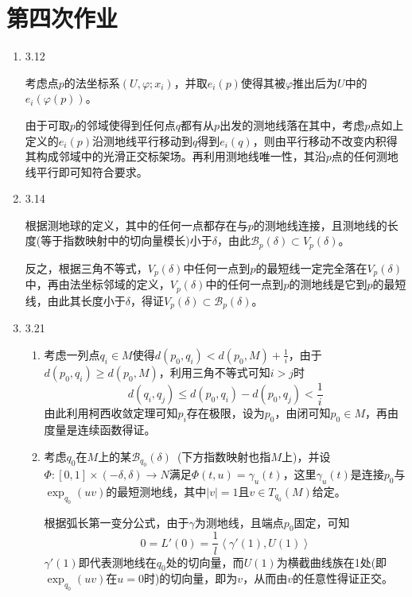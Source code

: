 \documentclass[a4paper,UTF8,fontset=windows,10pt]{ctexart}
\begin{document}
\section{第四次作业}
\begin{enumerate}
    \item 3.12
    
    考虑点$p$的法坐标系$(U,\varphi;x_i)$，并取$e_i(p)$使得其被$\varphi$推出后为$U$中的$e_i(\varphi(p))$。
    
    由于可取$p$的邻域使得到任何点$q$都有从$p$出发的测地线落在其中，考虑$p$点如上定义的$e_i(p)$沿测地线平行移动到$q$得到$e_i(q)$，则由平行移动不改变内积得其构成邻域中的光滑正交标架场。再利用测地线唯一性，其沿$p$点的任何测地线平行即可知符合要求。
    
    \item 3.14
    
    根据测地球的定义，其中的任何一点都存在与$p$的测地线连接，且测地线的长度(等于指数映射中的切向量模长)小于$\delta$，由此$\mathscr{B}_p(\delta)\subset V_p(\delta)$。
    
    反之，根据三角不等式，$V_p(\delta)$中任何一点到$p$的最短线一定完全落在$V_p(\delta)$中，再由法坐标邻域的定义，$V_p(\delta)$中的任何一点到$p$的测地线是它到$p$的最短线，由此其长度小于$\delta$，得证$V_p(\delta)\subset\mathscr{B}_p(\delta)$。
    
    \item 3.21
    \begin{enumerate}[(1)]
        \item 考虑一列点$q_i\in M$使得$d(p_0,q_i)<d(p_0,M)+\frac{1}{i}$，由于$d(p_0,q_i)\ge d(p_0,M)$，利用三角不等式可知$i>j$时
        $$d(q_i,q_j)\le d(p_0,q_i)-d(p_0,q_j)<\frac{1}{i}$$
        由此利用柯西收敛定理可知$p_i$存在极限，设为$p_0$，由闭可知$p_0\in M$，再由度量是连续函数得证。
    
        \item 考虑$q_0$在$M$上的某$\mathscr{B}_{q_0}(\delta)$\ (下方指数映射也指$M$上)，并设$\Phi:[0,1]\times(-\delta,\delta)\to N$满足$\Phi(t,u)=\gamma_u(t)$，这里$\gamma_u(t)$是连接$p_0$与$\exp_{q_0}(uv)$的最短测地线，其中$|v|=1$且$v\in T_{q_0}(M)$给定。
        
        根据弧长第一变分公式，由于$\gamma$为测地线，且端点$p_0$固定，可知
        $$0=L'(0)=\frac{1}{l}\left<\gamma'(1),U(1)\right>$$
        $\gamma'(1)$即代表测地线在$q_0$处的切向量，而$U(1)$为横截曲线族在1处(即$\exp_{q_0}(uv)$在$u=0$时)的切向量，即为$v$，从而由$v$的任意性得证正交。
    \end{enumerate}
    

\end{enumerate}
\end{document}

